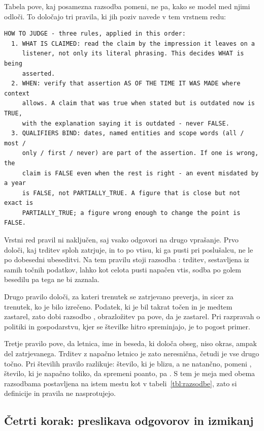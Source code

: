 \documentclass[a4paper, 12pt]{book}
\begin{document}
Tabela pove, kaj posamezna razsodba pomeni, ne pa, kako se model med njimi
odloči. To določajo tri pravila, ki jih poziv navede v tem vrstnem redu:

\begin{lstlisting}[basicstyle=\ttfamily\scriptsize,breaklines=true]
HOW TO JUDGE - three rules, applied in this order:
  1. WHAT IS CLAIMED: read the claim by the impression it leaves on a
     listener, not only its literal phrasing. This decides WHAT is being
     asserted.
  2. WHEN: verify that assertion AS OF THE TIME IT WAS MADE where context
     allows. A claim that was true when stated but is outdated now is TRUE,
     with the explanation saying it is outdated - never FALSE.
  3. QUALIFIERS BIND: dates, named entities and scope words (all / most /
     only / first / never) are part of the assertion. If one is wrong, the
     claim is FALSE even when the rest is right - an event misdated by a year
     is FALSE, not PARTIALLY_TRUE. A figure that is close but not exact is
     PARTIALLY_TRUE; a figure wrong enough to change the point is FALSE.
\end{lstlisting}

Vrstni red pravil ni naključen, saj vsako odgovori na drugo vprašanje. Prvo
določi, kaj trditev sploh zatrjuje, in to po vtisu, ki ga pusti pri poslušalcu,
ne le po dobesedni ubeseditvi. Na tem pravilu stoji razsodba :
trditev, sestavljena iz samih točnih podatkov, lahko kot celota pusti napačen
vtis, sodba po golem besedilu pa tega ne bi zaznala.

Drugo pravilo določi, za kateri trenutek se zatrjevano preverja, in sicer za
trenutek, ko je bilo izrečeno. Podatek, ki je bil takrat točen in je medtem
zastarel, zato dobi razsodbo , obrazložitev pa pove, da je zastarel. Pri razpravah o
politiki in gospodarstvu, kjer se številke hitro spreminjajo, je to pogost
primer.

Tretje pravilo pove, da letnica, ime in beseda, ki določa obseg, niso okras,
ampak del zatrjevanega. Trditev z napačno letnico je zato neresnična, četudi je vse drugo točno. Pri številih pravilo razlikuje: število, ki je blizu, a ne natančno,
pomeni , število, ki je napačno toliko, da spremeni poanto, pa
. S tem je meja med obema razsodbama postavljena na istem mestu kot
v tabeli~\ref{tbl:razsodbe}, zato si definicije in pravila ne nasprotujejo.

\subsection{Četrti korak: preslikava odgovorov in izmikanj}
\label{ssec:prehod4}
\end{document}
